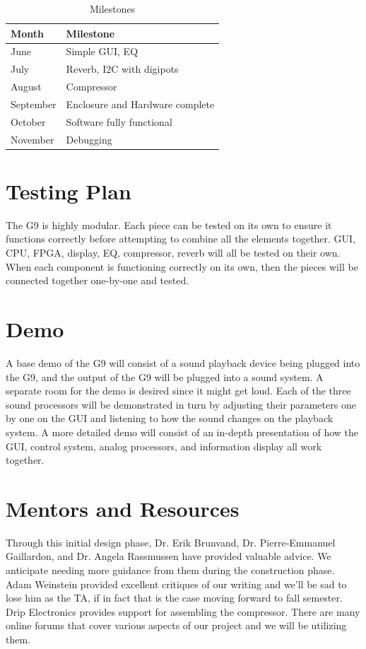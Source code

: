 \documentclass[journal]{IEEEtran}
\begin{document}
	\begin{table}[]
		\centering
		\caption{Milestones}
		\label{tab:milestones}
		\begin{tabular}{l|l}
			Month     & Milestone                       \\ \hline
			June      & Simple GUI, EQ                  \\
			July      & Reverb, I2C with digipots       \\
			August    & Compressor                      \\
			September & Enclosure and Hardware complete \\
			October   & Software fully functional       \\
			November  & Debugging                      
		\end{tabular}
	\end{table}
	


	
	\section{Testing Plan}
	The G9 is highly modular. Each piece can be tested on its own to ensure it functions correctly before attempting to combine all the elements together. GUI, CPU, FPGA, display, EQ, compressor, reverb will all be tested on their own. When each component is functioning correctly on its own, then the pieces will be connected together one-by-one and tested.
	
	\section{Demo}
	A base demo of the G9 will consist of a sound playback device being plugged into the G9, and the output of the G9 will be plugged into a sound system. A separate room for the demo is desired since it might get loud. Each of the three sound processors will be demonstrated in turn by adjusting their parameters one by one on the GUI and listening to how the sound changes on the playback system. A more detailed demo will consist of an in-depth presentation of how the GUI, control system, analog processors, and information display all work together.
	
	\section{Mentors and Resources}
	Through this initial design phase, Dr. Erik Brunvand, Dr. Pierre-Emmanuel Gaillardon, and Dr. Angela Rassmussen have provided valuable advice. We anticipate needing more guidance from them during the construction phase. Adam Weinstein provided excellent critiques of our writing and we'll be sad to lose him as the TA, if in fact that is the case moving forward to fall semester. Drip Electronics provides support for assembling the compressor. There are many online forums that cover various aspects of our project and we will be utilizing them.
	
\end{document}
